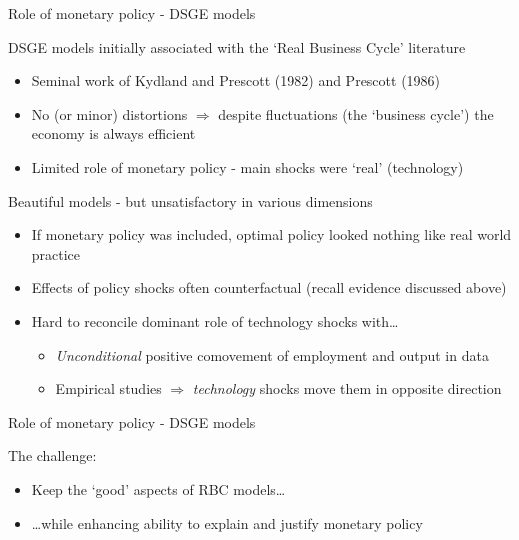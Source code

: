 \begin{frame}{Role of monetary policy - DSGE models}

DSGE models initially associated with the `Real Business Cycle' literature
\begin{itemize}
\item	Seminal work of Kydland and Prescott (1982) and Prescott (1986)
\item	No (or minor) distortions $\Rightarrow$ despite fluctuations (the `business cycle') the economy is always efficient
\item	Limited role of monetary policy - main shocks were `real' (technology)
\end{itemize}

\vspace{2mm}
Beautiful models - but unsatisfactory in various dimensions
\begin{itemize}
\item	If monetary policy was included, optimal policy looked nothing like real world practice
\item	Effects of policy shocks often counterfactual (recall evidence discussed above)
\item	Hard to reconcile dominant role of technology shocks with\ldots
	\begin{itemize}
	\item	\emph{Unconditional} positive comovement of employment and output in data
	\item	Empirical studies $\Rightarrow$ \emph{technology} shocks move them in opposite direction
	\end{itemize}
\end{itemize}

\end{frame}



\begin{frame}{Role of monetary policy - DSGE models}

The challenge:
\begin{itemize}
\item	Keep the `good' aspects of RBC models\ldots
\item	\ldots while enhancing ability to explain and justify monetary policy
\end{itemize}

\end{frame}

